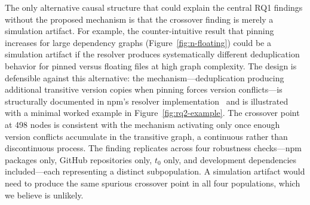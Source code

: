The only alternative causal structure that could explain the central RQ1 findings without the proposed mechanism is that the crossover finding is merely a simulation artifact.
For example, the counter-intuitive result that pinning increases  for large dependency graphs (Figure~\ref{fig:n-floating}) could be a simulation artifact if the  resolver produces systematically different deduplication behavior for pinned versus floating  files at high graph complexity.
The design is defensible against this alternative: the mechanism---deduplication producing additional transitive version copies when pinning forces version conflicts---is structurally documented in npm's resolver implementation~\cite{how-npm3-works} and is illustrated with a minimal worked example in Figure~\ref{fig:rq2-example}.
The crossover point at 498 nodes is consistent with the mechanism activating only once enough version conflicts accumulate in the transitive graph, a continuous rather than discontinuous process.
The finding replicates across four robustness checks---npm packages only, GitHub repositories only, $t_0$ only, and development dependencies included---each representing a distinct subpopulation.
A simulation artifact would need to produce the same spurious crossover point in all four populations, which we believe is unlikely.


